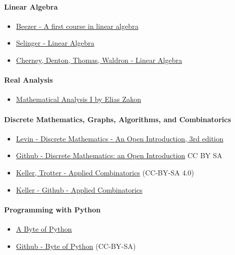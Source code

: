\documentclass[letter,12pt]{book}
\renewcommand{\0}{\mathbf{0}}
\begin{document}
\paragraph{\textbf{Linear Algebra}}
\begin{itemize}
\item\href{http://linear.ups.edu/html/fcla.html}{Beezer - A first course in linear algebra}
\item\href{https://github.com/selinger/linear-algebra}{Selinger - Linear Algebra}
\item\href{https://www.math.ucdavis.edu/~linear/linear-guest.pdf}{Cherney, Denton, Thomas, Waldron - Linear Algebra}
\end{itemize}

\paragraph{\textbf{Real Analysis}}
\begin{itemize}
\item\href{http://www.trillia.com/zakon-analysisI.html}{Mathematical Analysis I
by Elias Zakon}
\end{itemize}

\paragraph{\textbf{Discrete Mathematics, Graphs, Algorithms, and Combinatorics}}
\begin{itemize}
\item \href{http://discrete.openmathbooks.org/dmoi3.html}{Levin - Discrete Mathematics - An Open Introduction, 3rd edition}
\item \href{https://github.com/oscarlevin/discrete-book}{Github - Discrete Mathematics: an Open Introduction} CC BY SA
\item \href{http://www.rellek.net/book/frontmatter-1.html}{Keller, Trotter - Applied Combinatorics} (CC-BY-SA 4.0)
\item \href{https://github.com/mitchkeller/applied-combinatorics}{Keller - Github -  Applied Combinatorics}
\end{itemize}

\paragraph{\textbf{Programming with Python}}
\begin{itemize}
\item\href{https://open.umn.edu/opentextbooks/textbooks/a-byte-of-python}{A Byte of Python}
\item\href{https://github.com/swaroopch/byte-of-python}{Github - Byte of Python} (CC-BY-SA)
\end{itemize}
\end{document}
